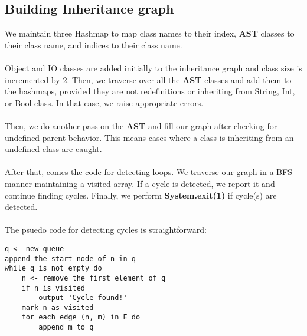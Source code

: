 \documentclass{article}
\begin{document}
\subsection{Building Inheritance graph}
We maintain three Hashmap to map class names to their index, \textbf{AST} classes to their class name, and indices to their class name. \\ \\
Object and IO classes are added initially to the inheritance graph and class size is incremented by 2. Then, we traverse over all the \textbf{AST} classes and add them to the hashmaps, provided they are not redefinitions or inheriting from String, Int, or Bool class. In that case, we raise appropriate errors. \\ \\
Then, we do another pass on the \textbf{AST} and fill our graph after checking for undefined parent behavior. This means cases where a class is inheriting from an undefined class are caught. \\ \\
After that, comes the code for detecting loops. We traverse our graph in a BFS manner maintaining a visited array. If a cycle is detected, we report it and continue finding cycles. Finally, we perform \textbf{System.exit(1)} if cycle(s) are detected.\\ \\
The psuedo code for detecting cycles is straightforward:  \\
\begin{lstlisting}
q <- new queue
append the start node of n in q
while q is not empty do
    n <- remove the first element of q
    if n is visited
        output 'Cycle found!'
    mark n as visited
    for each edge (n, m) in E do
        append m to q
\end{lstlisting}
\end{document}
